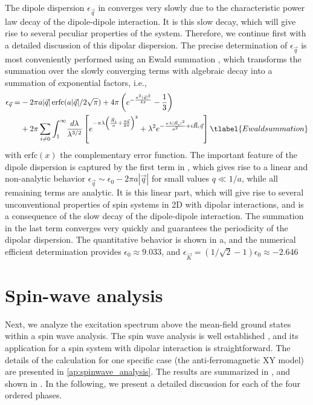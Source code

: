 The dipole dispersion $\epsilon_{\vec q}$ in 
converges very slowly due to the characteristic power law decay of the dipole-dipole
interaction. It is this slow decay, which will give rise to several peculiar
properties of the system. Therefore, we continue first with a detailed discussion
of this dipolar dispersion. The precise determination of $\epsilon_{\vec q}$ is
most conveniently performed using an Ewald summation \cite{Bonsall1977}, which transforms
the summation over the slowly converging terms with algebraic decay into a summation of exponential factors, i.e.,
%
\begin{align}
    \epsilon_{\vec q}   = &- 2 \pi a | {\vec q}|\,{\text{erfc}}(a |{\vec q}|/2\sqrt{\pi})   + 4 \pi \left( e^{- \frac{a^2 |{\vec q}|^2}{4 \pi}} - \frac{1}{3}\right)
\\
   & +     2 \pi \sum_{i\neq 0} \int_{1}^{\infty} \! \frac{d \lambda}{ \lambda^{3/2}} \left[ e^{- \pi  \lambda \left(\frac{ {\vec R}_{i}}{a} + \frac{a {\vec q}}{2 \pi}\right)^2} +\lambda^{2}  e^{- \frac{\pi \lambda |{\vec R}_{i}|^2}{a^2}+ i {\vec R}_{i}{\vec q}}\right]\tlabel{Ewaldsummation}
\end{align}
%
with ${\text{erfc}}(x)$ the complementary error function. The important feature of the dipole
dispersion is captured by the first term in , which
gives rise to a linear and non-analytic behavior $\epsilon_{\vec q} \sim
\epsilon_{0} - 2 \pi a |{\vec q}|$ for small values $q \ll 1/a $, while all
remaining terms are analytic. It is this linear part, which will give rise to
several unconventional properties of spin systems in 2D with dipolar
interactions, and is a consequence of the slow decay of the dipole-dipole
interaction. The summation in the last term converges very quickly and
guarantees the periodicity of the dipolar dispersion. The quantitative behavior
is shown in a, and the numerical efficient determination provides
$\epsilon_{0}\approx 9.033$, and $\epsilon_{\vec K}=(1/\sqrt{2}-1) \epsilon_{0}
\approx -2.646$


\section{Spin-wave analysis}

Next, we analyze the excitation spectrum above the mean-field ground states
within a spin wave analysis. The spin wave analysis is well
established \cite{Kubo1952,Auerbach1994}, and its application for a spin system with dipolar
interaction is straightforward. The details of the calculation for one specific case (the
anti-ferromagnetic XY model) are presented in \cref{ap:spinwave_analysis}. The results are
summarized in , and shown in . In the following, we present a detailed
discussion for each of the four ordered phases.




